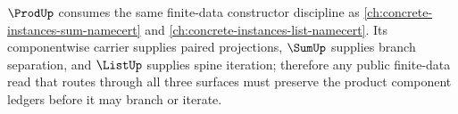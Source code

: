 \begin{proposition}\label{prop:prod-sum-list-finite-data-lattice}
$\ProdUp$ consumes the same finite-data constructor discipline as \autoref{ch:concrete-instances-sum-namecert} and \autoref{ch:concrete-instances-list-namecert}. Its componentwise carrier supplies paired projections, $\SumUp$ supplies branch separation, and $\ListUp$ supplies spine iteration; therefore any public finite-data read that routes through all three surfaces must preserve the product component ledgers before it may branch or iterate.
\end{proposition}
